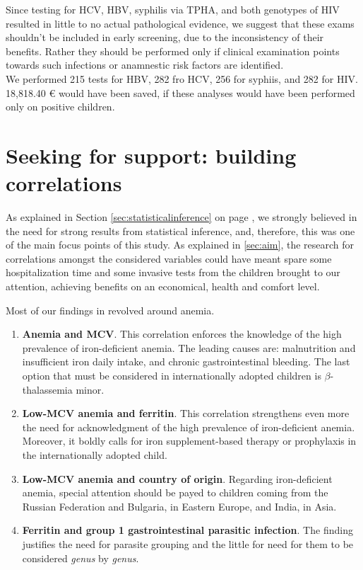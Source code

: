 Since testing for HCV, HBV, syphilis via TPHA, and both genotypes of HIV resulted in little to no actual pathological evidence, we suggest that these exams shouldn't be included in early screening, due to the inconsistency of their benefits. Rather they should be performed only if clinical examination points towards such infections or anamnestic risk factors are identified.\\
We performed 215 tests for HBV, 282 fro HCV, 256 for syphiis, and 282 for HIV. 18,818.40 € would have been saved, if these analyses would have been performed only on positive children.

\section{Seeking for support: building correlations}\label{sec:seekingforsupport}
As explained in Section \ref{sec:statisticalinference} on page \pageref{sec:statisticalinference}, we strongly believed in the need for strong results from statistical inference, and, therefore, this was one of the main focus points of this study. As explained in \ref{sec:aim}, the research for correlations amongst the considered variables could have meant spare some hospitalization time and some invasive tests from the children brought to our attention, achieving benefits on an economical, health and comfort level.

Most of our findings in revolved around anemia.

\begin{enumerate}
	\item \textbf{Anemia and MCV}. This correlation enforces the knowledge of the high prevalence of iron-deficient anemia. The leading causes are: malnutrition and insufficient iron daily intake, and chronic gastrointestinal bleeding. The last option that must be considered in internationally adopted children is $\beta$-thalassemia minor.
	\item \textbf{Low-MCV anemia and ferritin}. This correlation strengthens even more the need for acknowledgment of the high prevalence of iron-deficient anemia. Moreover, it boldly calls for iron supplement-based therapy or prophylaxis in the internationally adopted child.
	\item \textbf{Low-MCV anemia and country of origin}. Regarding iron-deficient anemia, special attention should be payed to children coming from the Russian Federation and Bulgaria, in Eastern Europe, and India, in Asia.
	\item \textbf{Ferritin and group 1 gastrointestinal parasitic infection}. The finding justifies the need for parasite grouping and the little for need for them to be considered \textit{genus} by \textit{genus}.
\end{enumerate}

